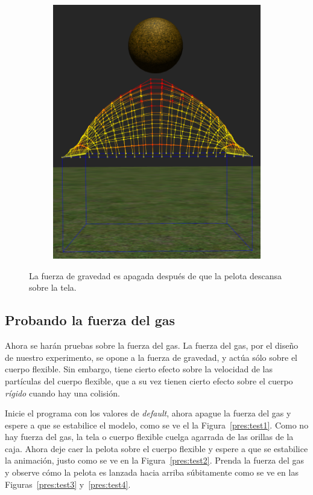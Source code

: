 \begin{figure}
\begin{subfigure}[b]{0.3\textwidth}
  \end{subfigure}
~
  \begin{subfigure}[b]{0.3\textwidth}
    \includegraphics[width=\textwidth]{img/04/gravityOff3}
  \end{subfigure}
 \caption[Experimento: Apagar la fuerza de gravedad]{La fuerza de gravedad es apagada después de que la pelota descansa sobre la tela.} 
 \label{fig:noGravity}
\end{figure}

\subsection{Probando la fuerza del gas}
Ahora se harán pruebas sobre la fuerza del gas. La fuerza del gas, por el diseño de nuestro experimento, se opone a la fuerza de gravedad, y actúa sólo sobre el cuerpo flexible.
Sin embargo, tiene cierto efecto sobre la velocidad de las partículas del cuerpo flexible, que a su vez tienen cierto efecto sobre el cuerpo \emph{rígido} cuando hay una colisión.

Inicie el programa con los valores de \emph{\textenglish{default}}, ahora apague la fuerza del gas y espere a que se estabilice el modelo, como se ve el la Figura~\ref{pres:test1}.
Como no hay fuerza del gas, la tela o cuerpo flexible cuelga agarrada de las orillas de la caja.
Ahora deje caer la pelota sobre el cuerpo flexible y espere a que se estabilice la animación, justo como se ve en la Figura~\ref{pres:test2}. 
Prenda la fuerza del gas y observe cómo la pelota es lanzada hacia arriba súbitamente como se ve en las Figuras~\ref{pres:test3} y~\ref{pres:test4}.

